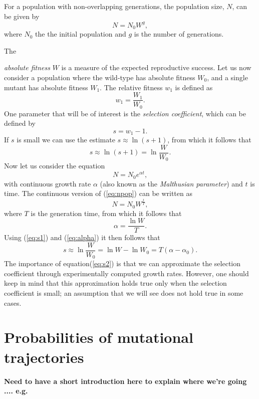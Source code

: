 \documentclass[12pt]{amsart}
\theoremstyle{plain}
\theoremstyle{definition}
\begin{document}
For a population with non-overlapping generations, the population size, $N$, can be given by
\begin{equation}
N=N_0  W^g, \label{eq:npop}
\end{equation}
where $N_0$ the the initial population and $g$ is the number of generations. 

The {{\emph{absolute fitness}}
$W$ is a measure of the expected reproductive success.  Let us now consider a population where
the wild-type has
absolute fitness $W_0$,
and a single mutant has 
absolute fitness $W_1$.
The relative fitness $w_1$
is defined as
\[
w_1=\frac{W_1}{W_0}.
\]
One parameter that will be of interest is the {\emph{selection coefficient}}, which can be defined by
\[
s=w_1-1.
\]
If $s$ is small we can use the estimate
$s \approx \ln(s+1)$, from which it follows that
\begin{equation}
s\approx \ln(s+1)=\ln \frac{W}{W_0} . \label{eq:s1}
\end{equation}
Now let us consider the equation
\[
N=N_0  e^{\alpha t},
\]
with continuous growth rate $\alpha$ (also known as the \emph{Malthusian
parameter})  and $t$ is time.
The continuous version of (\ref{eq:npop}) can be written as
\[ 
N=N_0  W^{\frac{t}{T}},
\]
where $T$ is the generation time, from which it follows that 
\begin{equation}
\alpha=\frac{\ln W }{T}. \label{eq:alpha}
\end{equation}
Using (\ref{eq:s1}) and (\ref{eq:alpha}) it then follows that
\begin{equation}
s \approx \ln \frac{W}{W_0} =\ln W- \ln W_0=T(\alpha-\alpha_0). \label{eq:s2}
\end{equation}
The importance of equation(\ref{eq:s2}) is that we can approximate the selection coefficient through experimentally computed growth rates.  However, one should keep in mind that this approximation holds true only when the selection coefficient is small; an assumption that we will see does not hold true in some cases.


\section{Probabilities of mutational trajectories}

{\bf Need to have a short introduction here to explain where we're going .... e.g.}

}
\end{document}
